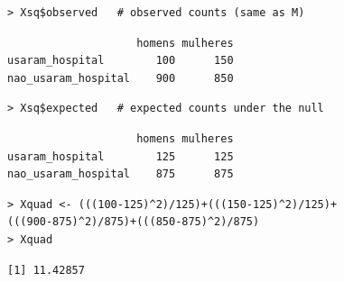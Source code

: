 \documentclass[14pt,aspectratio=1610]{beamer}
\begin{document}
\begin{frame}[fragile]{}
	\small
\begin{block}{}
\begin{verbatim}
> Xsq$observed   # observed counts (same as M)
\end{verbatim}

\begin{verbatim}
                    homens mulheres
usaram_hospital        100      150
nao_usaram_hospital    900      850    
\end{verbatim}

\begin{verbatim}
> Xsq$expected   # expected counts under the null    
\end{verbatim}


\begin{verbatim}
                    homens mulheres
usaram_hospital        125      125
nao_usaram_hospital    875      875    
\end{verbatim}

\begin{verbatim}
> Xquad <- (((100-125)^2)/125)+(((150-125)^2)/125)+
(((900-875)^2)/875)+(((850-875)^2)/875)
> Xquad    
\end{verbatim}
\begin{verbatim}
[1] 11.42857
\end{verbatim}

\end{block}    
\end{frame}
\end{document}
